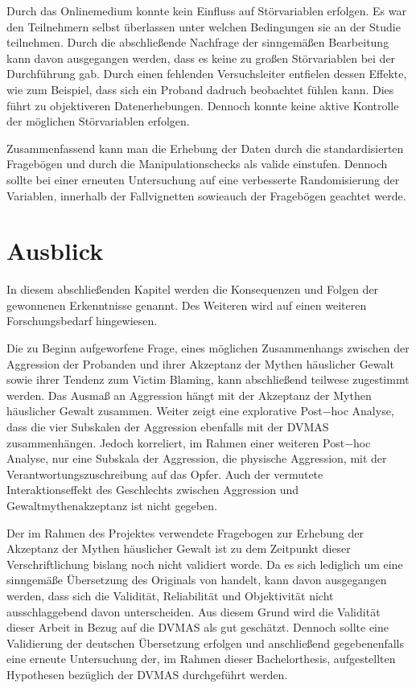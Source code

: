 Durch das Onlinemedium konnte kein Einfluss auf Störvariablen erfolgen. Es war den Teilnehmern selbst überlassen unter welchen Bedingungen sie an der Studie teilnehmen. Durch die abschließende Nachfrage der sinngemäßen Bearbeitung kann davon ausgegangen werden, dass es keine zu großen Störvariablen bei der Durchführung gab. Durch einen fehlenden Versuchsleiter entfielen dessen Effekte, wie zum Beispiel, dass sich ein Proband dadruch beobachtet fühlen kann. Dies führt zu objektiveren Datenerhebungen. Dennoch konnte keine aktive Kontrolle der möglichen Störvariablen erfolgen.

Zusammenfassend kann man die Erhebung der Daten durch die standardisierten Fragebögen und durch die Manipulationschecks als valide einstufen. Dennoch sollte bei einer erneuten Untersuchung auf eine verbesserte Randomisierung der Variablen, innerhalb der Fallvignetten sowieauch der Fragebögen geachtet werde. 


\section{Ausblick}    \label{sec_5.4}
In diesem abschließenden Kapitel werden die Konsequenzen und Folgen der gewonnenen Erkenntnisse genannt. Des Weiteren wird auf einen weiteren Forschungsbedarf hingewiesen.

Die zu Beginn aufgeworfene Frage, eines möglichen Zusammenhangs zwischen der Aggression der Probanden und ihrer Akzeptanz der Mythen häuslicher Gewalt sowie ihrer Tendenz zum Victim Blaming, kann abschließend teilwese zugestimmt werden. Das Ausmaß an Aggression hängt mit der Akzeptanz der Mythen häuslicher Gewalt zusammen. Weiter zeigt eine explorative Post$-$hoc Analyse, dass die vier Subskalen der Aggression ebenfalls mit der DVMAS zusammenhängen. Jedoch korreliert, im Rahmen einer weiteren Post$-$hoc Analyse, nur eine Subskala der Aggression, die physische Aggression, mit der Verantwortungszuschreibung auf das Opfer. Auch der vermutete Interaktionseffekt des Geschlechts zwischen Aggression und Gewaltmythenakzeptanz ist nicht gegeben. 

Der im Rahmen des Projektes verwendete Fragebogen zur Erhebung der Akzeptanz der Mythen häuslicher Gewalt ist zu dem Zeitpunkt dieser Verschriftlichung bislang noch nicht validiert worde. Da es sich lediglich um eine sinngemäße Übersetzung des Originals von \textcite{Peters2003} handelt, kann davon ausgegangen werden, dass sich die Validität, Reliabilität und Objektivität nicht ausschlaggebend davon unterscheiden. Aus diesem Grund wird die Validität dieser Arbeit in Bezug auf die DVMAS als gut geschätzt. Dennoch sollte eine Validierung der deutschen Übersetzung erfolgen und anschließend gegebenenfalls eine erneute Untersuchung der, im Rahmen dieser Bachelorthesis, aufgestellten Hypothesen bezüglich der DVMAS durchgeführt werden. 

